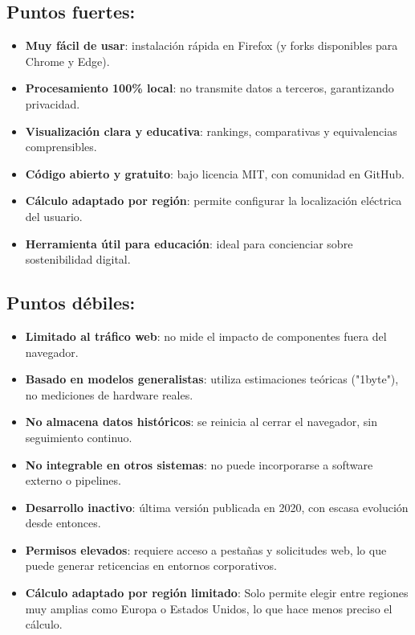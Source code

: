 \documentclass[12pt,a4paper]{report}
\begin{document}
\subsection*{Puntos fuertes:}

\begin{itemize}
  \item \textbf{Muy fácil de usar}: instalación rápida en Firefox (y forks disponibles para Chrome y Edge).
  \item \textbf{Procesamiento 100\% local}: no transmite datos a terceros, garantizando privacidad.
  \item \textbf{Visualización clara y educativa}: rankings, comparativas y equivalencias comprensibles.
  \item \textbf{Código abierto y gratuito}: bajo licencia MIT, con comunidad en GitHub.
  \item \textbf{Cálculo adaptado por región}: permite configurar la localización eléctrica del usuario.
  \item \textbf{Herramienta útil para educación}: ideal para concienciar sobre sostenibilidad digital.
\end{itemize}

\subsection*{Puntos débiles:}

\begin{itemize}
  \item \textbf{Limitado al tráfico web}: no mide el impacto de componentes fuera del navegador.
  \item \textbf{Basado en modelos generalistas}: utiliza estimaciones teóricas ("1byte"), no mediciones de hardware reales.
  \item \textbf{No almacena datos históricos}: se reinicia al cerrar el navegador, sin seguimiento continuo.
  \item \textbf{No integrable en otros sistemas}: no puede incorporarse a software externo o pipelines.
  \item \textbf{Desarrollo inactivo}: última versión publicada en 2020, con escasa evolución desde entonces.
  \item \textbf{Permisos elevados}: requiere acceso a pestañas y solicitudes web, lo que puede generar reticencias en entornos corporativos.
  \item \textbf{Cálculo adaptado por región limitado}: Solo permite elegir entre regiones muy amplias como Europa o Estados Unidos, lo que hace menos preciso el cálculo.
\end{itemize}
\end{document}
